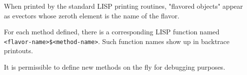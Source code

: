   When printed by the standard LISP printing routines, "flavored
objects" appear as evectors whose zeroth element is the name  of
the flavor.

  For  each  method  defined,  there  is  a  corresponding  LISP
function named\\
 \verb+<flavor-name>$<method-name>+. Such function names
show up in backtrace printouts.

  It is permissible to define new methods on the fly for debugging
purposes.

